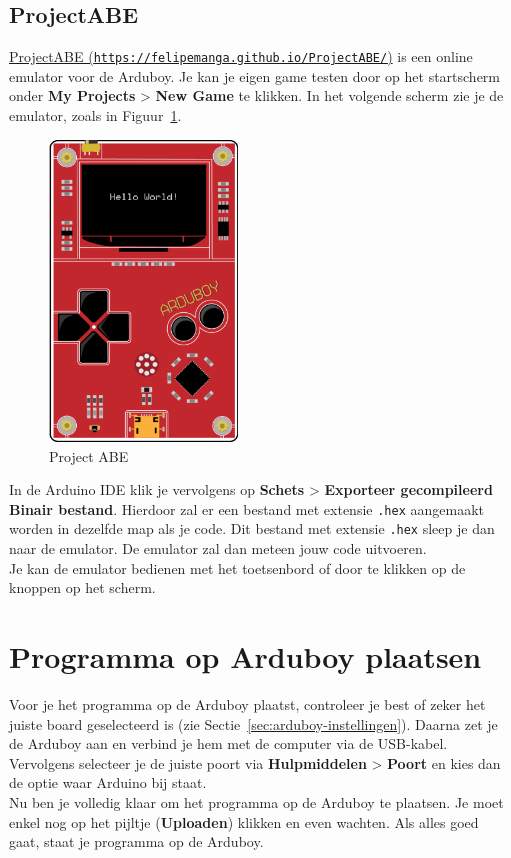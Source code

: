 \documentclass[11pt,fleqn]{book} %
\begin{document}
\subsection{ProjectABE}
\href{https://felipemanga.github.io/ProjectABE/}{ProjectABE (\texttt{https://felipemanga.github.io/ProjectABE/})} is een online emulator voor de Arduboy.
Je kan je eigen game testen door op het startscherm onder \textbf{My Projects} > \textbf{New Game} te klikken. In het volgende scherm zie je de emulator, zoals in Figuur~\ref{fig:projectabe}.
\begin{figure}
	\centering
	\includegraphics[width=5cm]{assets/ProjectABE}
	\caption{Project ABE}
	\label{fig:projectabe}
\end{figure}
In de Arduino IDE klik je vervolgens op \textbf{Schets} > \textbf{Exporteer gecompileerd Binair bestand}. Hierdoor zal er een bestand met extensie \texttt{.hex} aangemaakt worden in dezelfde map als je code. Dit bestand met extensie \texttt{.hex} sleep je dan naar de emulator. De emulator zal dan meteen jouw code uitvoeren.\\
Je kan de emulator bedienen met het toetsenbord of door te klikken op de knoppen op het scherm.

\section{Programma op Arduboy plaatsen}
Voor je het programma op de Arduboy plaatst, controleer je best of zeker het juiste board geselecteerd is (zie Sectie~\ref{sec:arduboy-instellingen}). Daarna zet je de Arduboy aan en verbind je hem met de computer via de USB-kabel. Vervolgens selecteer je de juiste poort via \textbf{Hulpmiddelen} > \textbf{Poort} en kies dan de optie waar Arduino bij staat.\\
Nu ben je volledig klaar om het programma op de Arduboy te plaatsen. Je moet enkel nog op het pijltje (\textbf{Uploaden}) klikken en even wachten. Als alles goed gaat, staat je programma op de Arduboy.
\end{document}
